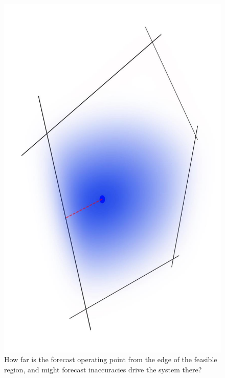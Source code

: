 \documentclass[journal,twoside]{IEEEtran}
\begin{document}
\begin{figure}
\centering
\includegraphics[angle=90,width=0.64\linewidth]{../images/stylizedFeas}
\caption{How far is the forecast operating point from the edge of the feasible region, and might forecast inaccuracies drive the system there?}
\label{fig:stylizedFeas}
\end{figure}
\end{document}
